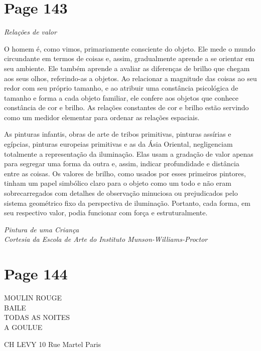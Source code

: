 \documentclass[a4paper]{article}
\begin{document}
\newpage
\section*{Page 143}

\noindent
\textit{Relações de valor}

\vspace{1em}

O homem é, como vimos, primariamente consciente do objeto. Ele mede o mundo circundante em termos de coisas e, assim, gradualmente aprende a se orientar em seu ambiente. Ele também aprende a avaliar as diferenças de brilho que chegam aos seus olhos, referindo-as a objetos. Ao relacionar a magnitude das coisas ao seu redor com seu próprio tamanho, e ao atribuir uma constância psicológica de tamanho e forma a cada objeto familiar, ele confere aos objetos que conhece constância de cor e brilho. As relações constantes de cor e brilho estão servindo como um medidor elementar para ordenar as relações espaciais.

As pinturas infantis, obras de arte de tribos primitivas, pinturas assírias e egípcias, pinturas europeias primitivas e as da Ásia Oriental, negligenciam totalmente a representação da iluminação. Elas usam a gradação de valor apenas para segregar uma forma da outra e, assim, indicar profundidade e distância entre as coisas. Os valores de brilho, como usados por esses primeiros pintores, tinham um papel simbólico claro para o objeto como um todo e não eram sobrecarregados com detalhes de observação minuciosa ou prejudicados pelo sistema geométrico fixo da perspectiva de iluminação. Portanto, cada forma, em seu respectivo valor, podia funcionar com força e estruturalmente.

\vspace{2em}

\centering
\textit{Pintura de uma Criança}\\
\textit{Cortesia da Escola de Arte do Instituto Munson-Williams-Proctor}
\par

\newpage
\section*{Page 144}

MOULIN ROUGE \\
BAILE \\
TODAS AS NOITES \\
A GOULUE

CH LEVY 10 Rue Martel Paris
\end{document}
